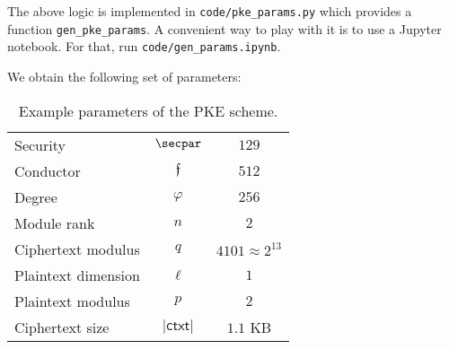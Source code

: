 \documentclass[a4paper,10pt]{article}
\newcommand{\ctxt}{\mathsf{ctxt}}
\newcommand{\conductor}{\mathfrak{f}}
\begin{document}
The above logic is implemented in \texttt{code/pke\_params.py} which provides a function \texttt{gen\_pke\_params}. 
A convenient way to play with it is to use a Jupyter notebook.
For that, run \texttt{code/gen\_params.ipynb}.

We obtain the following set of parameters: 

\begin{table}[h]
  \centering
  \begin{tabular}{lcc}
    Security & $\secpar$ & $129$  \\
    Conductor & $\conductor$ & $512$  \\
    Degree & $\varphi$ & $256$  \\
    Module rank & $n$ & $2$ \\ 
    Ciphertext modulus & $q$ & $4101 \approx 2^{13}$ \\ 
    Plaintext dimension & $\ell$ & $1$ \\
    Plaintext modulus & $p$ & $2$ \\ 
    Ciphertext size & $|\ctxt|$ & $1.1$ KB
  \end{tabular}
  \caption{Example parameters of the PKE scheme.}
\end{table}

\clearpage



\appendix
\clearpage
\end{document}
